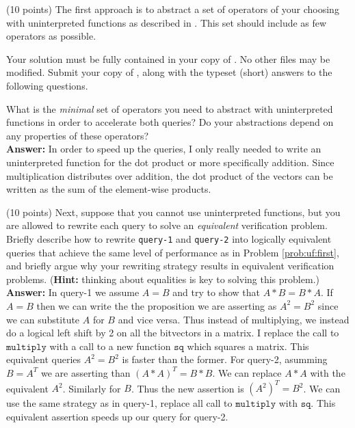 \documentclass{handout}
\begin{document}
\begin{questions}
\item \label{prob:uf:first} (10 points) The first approach is to abstract a set
of operators of your choosing with uninterpreted functions as described in
.  This set should include as few operators as possible.

Your solution must be fully contained in your copy of .  No
other files may be modified.  Submit your copy of , along with
the typeset (short) answers to the following questions.

What is the \emph{minimal} set of operators you need to abstract with
uninterpreted functions in order to accelerate both queries?   Do your
abstractions depend on any properties of these operators?\\

\textbf{Answer:}
In order to speed up the queries, I only really needed to write an uninterpreted function for the dot product or more specifically addition. Since multiplication distributes over addition, the dot product of the vectors can be written as the sum of the element-wise products.



\item \label{prob:uf:last} (10 points)  Next, suppose that you cannot use
uninterpreted functions, but you are allowed to rewrite each query to solve an
\emph{equivalent} verification problem.  Briefly describe how to rewrite
\texttt{query-1} and \texttt{query-2} into logically equivalent queries that
achieve the same level of performance as in Problem \ref{prob:uf:first}, and
briefly argue why your rewriting strategy results in equivalent verification
problems. (\textbf{Hint:}  thinking about equalities is key to solving this
problem.)\\
\textbf{Answer:}
In query-1 we assume $A = B$ and try to show that $A * B = B * A$. If $A = B$ then we can write the the proposition we are asserting as $ A^2 = B^2$ since we can substitute $A$ for $B$ and vice versa. Thus instead of multiplying, we instead do a logical left shift by 2 on all the bitvectors in a matrix. I replace the call to $\mathtt{multiply}$ with a call to a new function $\mathtt{sq}$ which squares a matrix. This equivalent queries $A^2 = B^2$ is faster than the former. For query-2, asumming $B = A^T$ we are asserting than $(A*A)^T = B * B$. We can replace $A*A$ with the equivalent $A^2$. Similarly for $B$. Thus the new assertion is $(A^2)^T = B^2$. We can use the same strategy as in query-1, replace all call to $\mathtt{multiply}$ with $\mathtt{sq}$. This equivalent assertion speeds up our query for query-2.



\end{questions}
\end{document}
